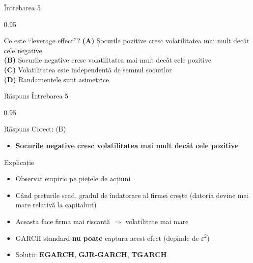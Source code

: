 \documentclass[9pt, aspectratio=169, t]{beamer}
\begin{document}
\begin{frame}{Întrebarea 5}
    \begin{cminipage}{0.95\textwidth}
    \begin{block}{Ce este ``leverage effect''?}
        \textcolor{MainBlue}{\textbf{(A)}} Șocurile pozitive cresc volatilitatea mai mult decât cele negative\\[3pt]
        \textcolor{MainBlue}{\textbf{(B)}} Șocurile negative cresc volatilitatea mai mult decât cele pozitive\\[3pt]
        \textcolor{MainBlue}{\textbf{(C)}} Volatilitatea este independentă de semnul șocurilor\\[3pt]
        \textcolor{MainBlue}{\textbf{(D)}} Randamentele sunt asimetrice
    \end{block}
    \end{cminipage}
\end{frame}

\begin{frame}{Răspuns Întrebarea 5}
    \begin{cminipage}{0.95\textwidth}
    \begin{exampleblock}{Răspuns Corect: (B)}
        \begin{itemize}\setlength{\itemsep}{0pt}
            \item \textbf{Șocurile negative cresc volatilitatea mai mult decât cele pozitive}
        \end{itemize}
    \end{exampleblock}

    \pause
    \begin{block}{Explicație}
        \begin{itemize}\setlength{\itemsep}{0pt}
            \item Observat empiric pe piețele de acțiuni
            \item Când prețurile scad, gradul de îndatorare al firmei crește (datoria devine mai mare relativă la capitaluri)
            \item Aceasta face firma mai riscantă $\Rightarrow$ volatilitate mai mare
            \item GARCH standard \textbf{nu poate} captura acest efect (depinde de $\varepsilon^2$)
            \item Soluții: \textbf{EGARCH}, \textbf{GJR-GARCH}, \textbf{TGARCH}
        \end{itemize}
    \end{block}
    \end{cminipage}
\end{frame}
\end{document}
